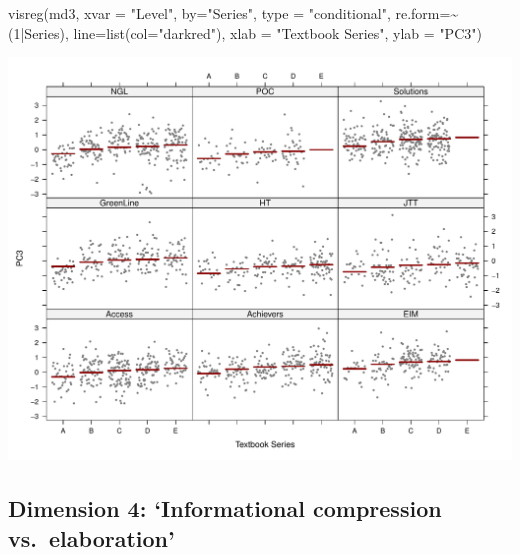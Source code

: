 \documentclass[
  letterpaper,
  DIV=11,
  numbers=noendperiod]{scrreprt}
\newenvironment{Shaded}{\begin{snugshade}}{\end{snugshade}}
\newcommand{\AttributeTok}[1]{\textcolor[rgb]{0.40,0.45,0.13}{#1}}
\newcommand{\DecValTok}[1]{\textcolor[rgb]{0.68,0.00,0.00}{#1}}
\newcommand{\FunctionTok}[1]{\textcolor[rgb]{0.28,0.35,0.67}{#1}}
\newcommand{\NormalTok}[1]{\textcolor[rgb]{0.00,0.23,0.31}{#1}}
\newcommand{\SpecialCharTok}[1]{\textcolor[rgb]{0.37,0.37,0.37}{#1}}
\newcommand{\StringTok}[1]{\textcolor[rgb]{0.13,0.47,0.30}{#1}}
\begin{document}
\begin{Shaded}
\begin{Highlighting}[]
\FunctionTok{visreg}\NormalTok{(md3, }\AttributeTok{xvar =} \StringTok{"Level"}\NormalTok{, }\AttributeTok{by=}\StringTok{"Series"}\NormalTok{, }\AttributeTok{type =} \StringTok{"conditional"}\NormalTok{, }\AttributeTok{re.form=}\SpecialCharTok{\textasciitilde{}}\NormalTok{(}\DecValTok{1}\SpecialCharTok{|}\NormalTok{Series), }
       \AttributeTok{line=}\FunctionTok{list}\NormalTok{(}\AttributeTok{col=}\StringTok{"darkred"}\NormalTok{), }\AttributeTok{xlab =} \StringTok{"Textbook Series"}\NormalTok{, }\AttributeTok{ylab =} \StringTok{"PC3"}\NormalTok{)}
\end{Highlighting}
\end{Shaded}

\includegraphics{E_Ch6_Analysis_files/figure-pdf/Dim3comparisons-3.pdf}

\subsection{Dimension 4: `Informational compression
vs.~elaboration'}\label{dimension-4-informational-compression-vs.-elaboration}
\end{document}
